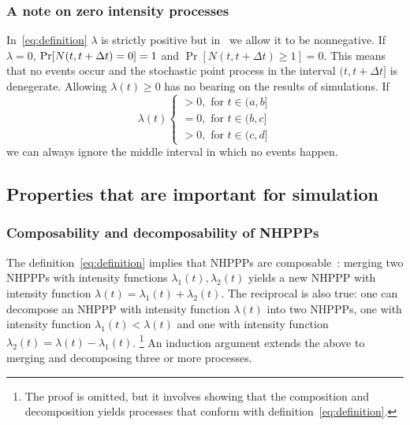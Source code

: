 \documentclass[article]{jss}\usepackage[]{graphicx}\usepackage[]{xcolor}
\begin{document}
\subsubsection{A note on zero intensity processes}
In~\eqref{eq:definition} $\lambda$ is strictly positive but in~ we allow it to be nonnegative. If $\lambda = 0$, $\\{\Pr[N(t, t + \Delta t) = 0] = 1}$ and ${\Pr[N(t, t + \Delta t) \ge 1] = 0}$. This means that no events occur and the stochastic point process in the interval $(t, t + \Delta t]$ is denegerate. Allowing $\lambda(t) \ge 0$ has no bearing on the results of simulations. If
\begin{equation*}
    \lambda(t)  \begin{cases}
    >0, \text{ for } t \in (a, b] \\
    =0, \text{ for } t \in (b, c] \\
    >0, \text{ for } t \in (c, d]
    \end{cases}
\end{equation*}
we can always ignore the middle interval in which no events happen.

\subsection{Properties that are important for simulation}\label{sec:properties}
\subsubsection{Composability and decomposability of NHPPPs}
The definition~\eqref{eq:definition} implies that NHPPPs are composable~\citep[par. 4.2]{cox1965theory}: merging two NHPPPs with intensity functions $\lambda_1(t), \lambda_2(t)$ yields a new NHPPP with intensity function $\lambda(t) = \lambda_1(t) + \lambda_2(t)$. The reciprocal is also true: one can decompose an NHPPP with intensity function $\lambda(t)$ into two NHPPPs, one with intensity function $\lambda_1(t) < \lambda(t)$ and one with intensity function ${\lambda_2(t) = \lambda(t)-\lambda_1(t)}$.%
\footnote{The proof is omitted, but it involves showing that the composition and decomposition yields processes that conform with definition~\eqref{eq:definition}.} An induction argument extends the above to merging and decomposing three or more processes.
\end{document}
